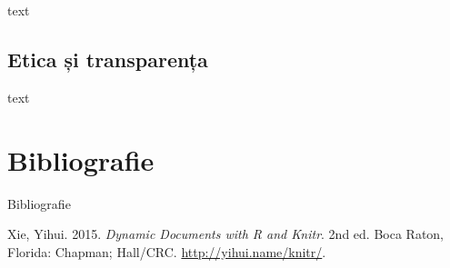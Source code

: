 \documentclass[
  11pt,
  b5paper,
  nottoc]{book}
\newlength{\cslhangindent}
\newlength{\cslentryspacingunit} %
\newenvironment{CSLReferences}[2] %
 {%
  \setlength{\parindent}{0pt}
  \ifodd #1
  \let\oldpar\par
  \def\par{\hangindent=\cslhangindent\oldpar}
  \fi
  \setlength{\parskip}{#2\cslentryspacingunit}
 }%
 {}
\begin{document}
text

\hypertarget{etica-ux219i-transparenux21ba}{%
\section{Etica și transparența}\label{etica-ux219i-transparenux21ba}}

text


\hypertarget{bibliografie}{%
\chapter*{Bibliografie}\label{bibliografie}}


Bibliografie

\hypertarget{refs}{}
\begin{CSLReferences}{1}{0}
\leavevmode{}%
Xie, Yihui. 2015. \emph{Dynamic Documents with {R} and Knitr}. 2nd ed.
Boca Raton, Florida: Chapman; Hall/CRC. \url{http://yihui.name/knitr/}.

\end{CSLReferences}


\backmatter
\end{document}
